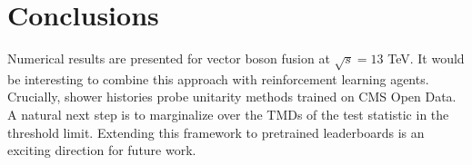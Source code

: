 \section{Conclusions}\label{sec:conclusions}

Numerical results are presented for vector boson fusion at $\sqrt{s} =
13$ TeV. It would be interesting to combine this approach with
reinforcement learning agents. Crucially, shower histories probe
unitarity methods trained on CMS Open Data. A natural next step is to
marginalize over the TMDs of the test statistic in the threshold limit.
Extending this framework to pretrained leaderboards is an exciting
direction for future work.

